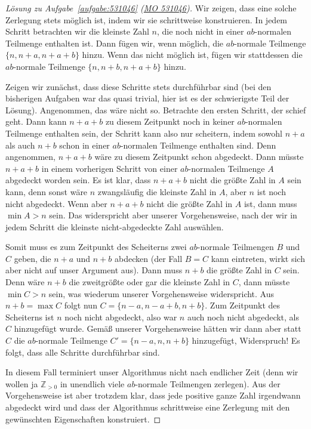 \begin{proof}[Lösung zu Aufgabe~\ref{aufgabe:531046} \textmd{(\href{https://www.mathematik-olympiaden.de/moev/index.php?option=com_download&thema=a&format=raw&datei=A53104b.pdf}{MO 531046})}]
	Wir zeigen, dass eine solche Zerlegung stets möglich ist, indem wir sie schrittweise konstruieren. In jedem Schritt betrachten wir die kleinste Zahl $n$, die noch nicht in einer $ab$-normalen Teilmenge enthalten ist. Dann fügen wir, wenn möglich, die $ab$-normale Teilmenge $\{n,n+a,n+a+b\}$ hinzu. Wenn das nicht möglich ist, fügen wir stattdessen die $ab$-normale Teilmenge $\{n,n+b,n+a+b\}$ hinzu.
	
	Zeigen wir zunächst, dass diese Schritte stets durchführbar sind (bei den bisherigen Aufgaben war das quasi trivial, hier ist es der schwierigste Teil der Lösung). Angenommen, das wäre nicht so. Betrachte den ersten Schritt, der schief geht. Dann kann $n+a+b$ zu diesem Zeitpunkt noch in keiner $ab$-normalen Teilmenge enthalten sein, der Schritt kann also nur scheitern, indem sowohl $n+a$ als auch $n+b$ schon in einer $ab$-normalen Teilmenge enthalten sind. Denn angenommen, $n+a+b$ wäre zu diesem Zeitpunkt schon abgedeckt. Dann müsste $n+a+b$ in einem vorherigen Schritt von einer $ab$-normalen Teilmenge $A$ abgedeckt worden sein. Es ist klar, dass $n+a+b$ nicht die größte Zahl in $A$ sein kann, denn sonst wäre $n$ zwangsläufig die kleinste Zahl in $A$, aber $n$ ist noch nicht abgedeckt. Wenn aber $n+a+b$ nicht die größte Zahl in $A$ ist, dann muss $\min A> n$ sein. Das widerspricht aber unserer Vorgehensweise, nach der wir in jedem Schritt die kleinste nicht-abgedeckte Zahl auswählen.
	
	Somit muss es zum Zeitpunkt des Scheiterns zwei $ab$-normale Teilmengen $B$ und $C$ geben, die $n+a$ und $n+b$ abdecken (der Fall $B=C$ kann eintreten, wirkt sich aber nicht auf unser Argument aus). Dann muss $n+b$ die größte Zahl in $C$ sein. Denn wäre $n+b$ die zweitgrößte oder gar die kleinste Zahl in $C$, dann müsste $\min C>n$ sein, was wiederum unserer Vorgehensweise widerspricht. Aus $n+b=\max C$ folgt nun $C=\{n-a,n-a+b,n+b\}$. Zum Zeitpunkt des Scheiterns ist $n$ noch nicht abgedeckt, also war $n$ auch noch nicht abgedeckt, als $C$ hinzugefügt wurde. Gemäß unserer Vorgehensweise hätten wir dann aber statt $C$ die $ab$-normale Teilmenge $C'=\{n-a,n,n+b\}$ hinzugefügt, Widerspruch! Es folgt, dass alle Schritte durchführbar sind.
	
	In diesem Fall terminiert unser Algorithmus nicht nach endlicher Zeit (denn wir wollen ja $\mathbb Z_{>0}$ in unendlich viele $ab$-normale Teilmengen zerlegen). Aus der Vorgehensweise ist aber trotzdem klar, dass jede positive ganze Zahl irgendwann abgedeckt wird und dass der Algorithmus schrittweise eine Zerlegung mit den gewünschten Eigenschaften konstruiert.
\end{proof}
